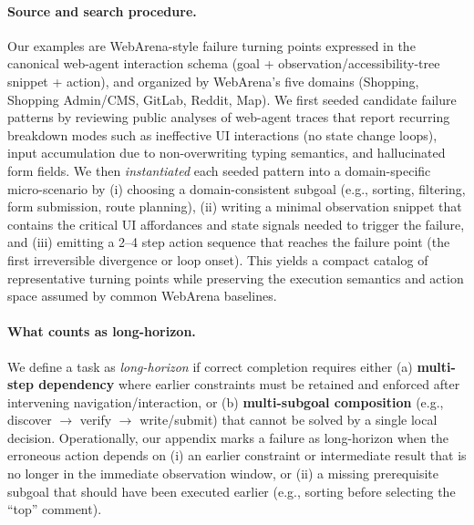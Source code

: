 \documentclass[11pt]{article}
\begin{document}
\paragraph{Source and search procedure.}
Our examples are WebArena-style failure turning points expressed in the canonical web-agent interaction schema (goal + observation/accessibility-tree snippet + action), and organized by WebArena's five domains (Shopping, Shopping Admin/CMS, GitLab, Reddit, Map). We first seeded candidate failure patterns by reviewing public analyses of web-agent traces that report recurring breakdown modes such as ineffective UI interactions (no state change loops), input accumulation due to non-overwriting typing semantics, and hallucinated form fields.
We then \emph{instantiated} each seeded pattern into a domain-specific micro-scenario by (i) choosing a domain-consistent subgoal (e.g., sorting, filtering, form submission, route planning), (ii) writing a minimal observation snippet that contains the critical UI affordances and state signals needed to trigger the failure, and (iii) emitting a 2--4 step action sequence that reaches the failure point (the first irreversible divergence or loop onset). This yields a compact catalog of representative turning points while preserving the execution semantics and action space assumed by common WebArena baselines.

\paragraph{What counts as long-horizon.}
We define a task as \emph{long-horizon} if correct completion requires either (a) \textbf{multi-step dependency} where earlier constraints must be retained and enforced after intervening navigation/interaction, or (b) \textbf{multi-subgoal composition} (e.g., discover $\rightarrow$ verify $\rightarrow$ write/submit) that cannot be solved by a single local decision. Operationally, our appendix marks a failure as long-horizon when the erroneous action depends on (i) an earlier constraint or intermediate result that is no longer in the immediate observation window, or (ii) a missing prerequisite subgoal that should have been executed earlier (e.g., sorting before selecting the ``top'' comment).
\end{document}
